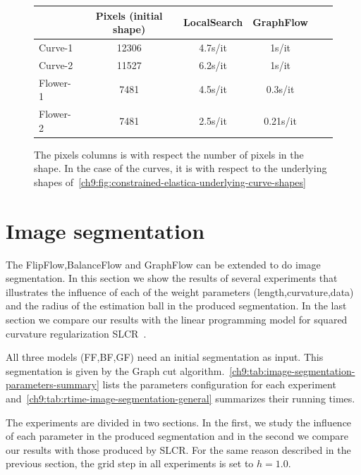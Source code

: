 \begin{figure}
\center
\captionsetup{type=table}
\begin{tabular}{|l|c|c|c|c|c|}
\hline
& Pixels (initial shape) & LocalSearch & GraphFlow \\
\hline
Curve-1 & 12306 & 4.7s/it & 1s/it\\
Curve-2 & 11527 & 6.2s/it & 1s/it\\
Flower-1  & 7481 & 4.5s/it & 0.3s/it \\
Flower-2 & 7481 & 2.5s/it & 0.21s/it\\
\hline
\end{tabular}
\caption{ The pixels columns is with respect the number of pixels in the shape. In the case of the curves, it is with respect to the underlying shapes of~\cref{ch9:fig:constrained-elastica-underlying-curve-shapes}}
\label{ch9:tab:rtime-constrained-elastica-general} 
\end{figure}


\section{Image segmentation}

The FlipFlow,BalanceFlow and GraphFlow can be extended to do image segmentation. In this section we show the results of several experiments that illustrates the influence of each of the weight parameters (length,curvature,data) and the radius of the estimation ball in the produced segmentation. In the last section we compare our results with the linear programming model for squared curvature regularization SLCR~\cite{schoenemann09linear}. 

All three models (FF,BF,GF) need an initial segmentation as input. This segmentation is given by the Graph cut algorithm.~\cref{ch9:tab:image-segmentation-parameters-summary} lists the parameters configuration for each experiment and~\cref{ch9:tab:rtime-image-segmentation-general} summarizes their running times. 

The experiments are divided in two sections. In the first, we study the influence of each parameter in the produced segmentation and in the second we compare our results with those produced by SLCR. For the same reason described in the previous section, the grid step in all experiments is set to $h=1.0$.


